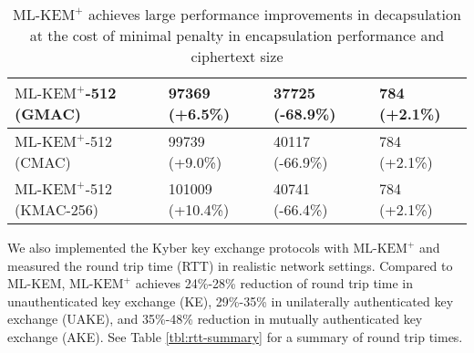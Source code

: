 \documentclass[journal=tches,submission]{iacrtrans}
\def\mlkemplus{\text{ML-KEM}^+}
\begin{document}
\begin{table}[h]
\begin{tabular}{|p{2.5cm}|p{1.4cm}|p{1.4cm}|p{1.4cm}|}
       $\mlkemplus$-512 \newline (GMAC)
       & 97369 \newline (+6.5\%)
       & 37725 \newline (-68.9\%)
       & 784 \newline (+2.1\%) \\
       \hline
       $\mlkemplus$-512 \newline (CMAC)
       & 99739 \newline (+9.0\%)
       & 40117 \newline (-66.9\%)
       & 784 \newline (+2.1\%) \\
       \hline
       $\mlkemplus$-512 \newline (KMAC-256)
       & 101009 \newline (+10.4\%)
       & 40741 \newline (-66.4\%)
       & 784 \newline (+2.1\%) \\
       \hline
    \end{tabular}

    \caption{$\mlkemplus$ achieves large performance improvements in decapsulation at the cost of minimal penalty in encapsulation performance and ciphertext size}\label{tbl:cpu-cycles-summary}
\end{table}

We also implemented the Kyber key exchange protocols \cite{DBLP:conf/eurosp/BosDKLLSSSS18} with $\mlkemplus$ and measured the round trip time (RTT) in realistic network settings. Compared to ML-KEM, $\mlkemplus$ achieves 24\%-28\% reduction of round trip time in unauthenticated key exchange (KE), 29\%-35\% in unilaterally authenticated key exchange (UAKE), and 35\%-48\% reduction in mutually authenticated key exchange (AKE). See Table \ref{tbl:rtt-summary} for a summary of round trip times.
\end{document}

